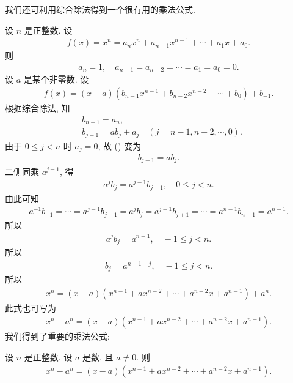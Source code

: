 \myLine

我们还可利用综合除法得到一个很有用的乘法公式.

设 $n$ 是正整数. 设
\begin{align*}
    f(x) = x^n = a_n x^n + a_{n-1} x^{n-1} + \cdots + a_1 x + a_0.
\end{align*}
则
\begin{align*}
    a_n = 1, \quad a_{n-1} = a_{n-2} = \cdots = a_1 = a_0 = 0.
\end{align*}
设 $a$ 是某个非零数. 设
\begin{align*}
    f(x) = (x - a) (b_{n-1} x^{n-1} + b_{n-2} x^{n-2} + \cdots + b_0) + b_{-1}.
\end{align*}
根据综合除法, 知
\begin{align*}
     & b_{n-1} = a_n,                                                      \\
     & b_{j-1} = ab_j + a_j \quad (j = n-1,n-2,\cdots,0). \tag*{(\myStar)}
\end{align*}
由于 $0 \leq j < n$ 时 $a_j = 0$, 故 (\myStar) 变为
\begin{align*}
    b_{j-1} = ab_j.
\end{align*}
二侧同乘 $a^{j-1}$, 得
\begin{align*}
    a^j b_j = a^{j-1} b_{j-1}, \quad 0 \leq j < n.
\end{align*}
由此可知
\begin{align*}
    a^{-1} b_{-1} = \cdots = a^{j-1} b_{j-1} = a^j b_j = a^{j+1} b_{j+1} = \cdots = a^{n-1} b_{n-1} = a^{n-1}.
\end{align*}
所以
\begin{align*}
    a^j b_j = a^{n-1}, \quad -1 \leq j < n.
\end{align*}
所以
\begin{align*}
    b_j = a^{n-1-j}, \quad -1 \leq j < n.
\end{align*}
所以
\begin{align*}
    x^n = (x - a)(x^{n-1} + ax^{n-2} + \cdots + a^{n-2}x + a^{n-1}) + a^n.
\end{align*}
此式也可写为
\begin{align*}
    x^n - a^n = (x - a)(x^{n-1} + ax^{n-2} + \cdots + a^{n-2}x + a^{n-1}).
\end{align*}
我们得到了重要的乘法公式:
\begin{proposition}
    设 $n$ 是正整数. 设 $a$ 是数, 且 $a \neq 0$. 则
    \begin{align*}
        x^n - a^n = (x - a)(x^{n-1} + ax^{n-2} + \cdots + a^{n-2}x + a^{n-1}).
    \end{align*}
\end{proposition}


